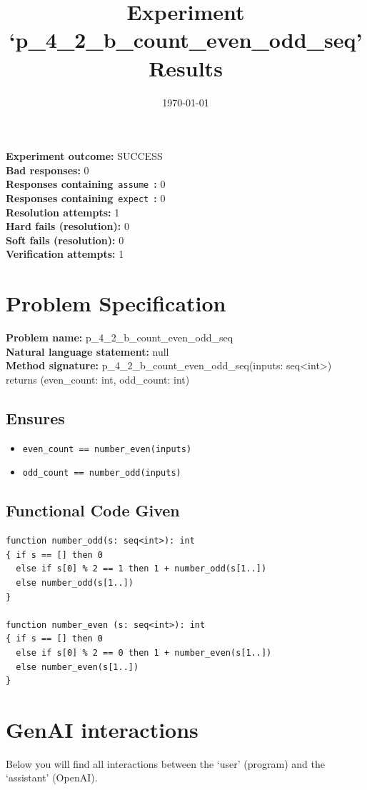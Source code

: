 \documentclass{article}
\begin{document}
\title{Experiment `p\_4\_2\_b\_count\_even\_odd\_seq' Results}
\author{\today}
\date{}
\maketitle
\textbf{Experiment outcome: }SUCCESS
\\\textbf{Bad responses: }0
\\\textbf{Responses containing}~\texttt{assume}~\textbf{: }0
\\\textbf{Responses containing}~\texttt{expect}~\textbf{: }0
\\\textbf{Resolution attempts: }1
\\\textbf{Hard fails (resolution): }0
\\\textbf{Soft fails (resolution): }0
\\\textbf{Verification attempts: }1
\section*{Problem Specification}
\textbf{Problem name: }p\_4\_2\_b\_count\_even\_odd\_seq
\\\textbf{Natural language statement: }null
\\\textbf{Method signature: }p\_4\_2\_b\_count\_even\_odd\_seq(inputs: seq<int>) returns (even\_count: int, odd\_count: int)
\subsection*{Ensures}
\begin{itemize}
\item \texttt{even\_count == number\_even(inputs)}
\item \texttt{odd\_count == number\_odd(inputs)}
\end{itemize}
\subsection*{Functional Code Given}
\begin{lstlisting}
function number_odd(s: seq<int>): int
{ if s == [] then 0
  else if s[0] % 2 == 1 then 1 + number_odd(s[1..])
  else number_odd(s[1..])
}

function number_even (s: seq<int>): int
{ if s == [] then 0
  else if s[0] % 2 == 0 then 1 + number_even(s[1..])
  else number_even(s[1..])
}
\end{lstlisting}
\clearpage
\section*{GenAI interactions}
Below you will find all interactions between the `user' (program) and the `assistant' (OpenAI).
\end{document}
